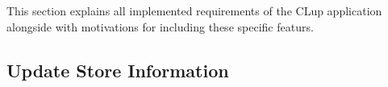 
This section explains all implemented requirements of the CLup application alongside with motivations for including these specific featurs.

\subsection{Update Store Information}

\subsubsection{}
